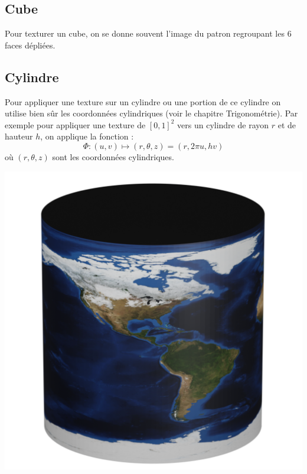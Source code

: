 \documentclass[11pt,class=report,crop=false]{standalone}
\begin{document}
\subsection{Cube}

Pour texturer un cube, on se donne souvent l'image du patron regroupant les $6$ faces dépliées.


\subsection{Cylindre}

Pour appliquer une texture sur un cylindre ou une portion de ce cylindre on utilise bien sûr les coordonnées cylindriques (voir le chapitre \og{}Trigonométrie\fg{}).
Par exemple pour appliquer une texture de $[0,1]^2$ vers un cylindre de rayon $r$ et de hauteur $h$, on applique la fonction :
$$\Phi : (u,v)  \longmapsto (r, \theta, z) = (r, 2\pi u, hv)$$
où $(r,\theta,z)$ sont les coordonnées cylindriques.

\begin{center}
    \includegraphics[scale=\myscale,scale=0.30]{figures/cylindre-texture}    
\end{center}
\end{document}
